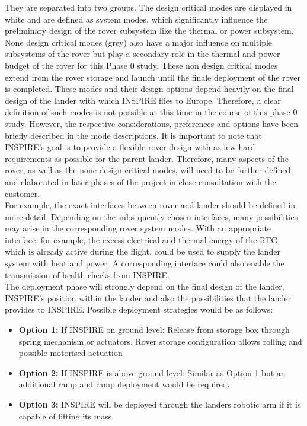 They are separated into two groups. The design critical modes are displayed in white and are defined as system modes, which significantly influence the preliminary design of the rover subsystem like the thermal or power subsystem. None design critical modes (grey) also have a major influence on multiple subsystems of the rover but play a secondary role in the thermal and power budget of the rover for this Phase 0 study. These non design critical modes extend from the rover storage and launch until the finale deployment of the rover is completed. These modes and their design options depend heavily on the final design of the lander with which INSPIRE flies to Europe. Therefore, a clear definition of such modes is not possible at this time in the course of this phase 0 study. However, the respective considerations, preferences and options have been briefly described in the mode descriptions. It is important to note that INSPIRE's goal is to provide a flexible rover design with as few hard requirements as possible for the parent lander. Therefore, many aspects of the rover, as well as the none design critical modes, will need to be further defined and elaborated in later phases of the project in close consultation with the customer. \\
For example, the exact interfaces between rover and lander should be defined in more detail. Depending on the subsequently chosen interfaces, many possibilities may arise in the corresponding rover system modes. With an appropriate interface, for example, the excess electrical and thermal energy of the RTG, which is already active during the flight, could be used to supply the lander system with heat and power. A corresponding interface could also enable the transmission of health checks from INSPIRE. \\
The deployment phase will strongly depend on the final design of the lander, INSPIRE's position within the lander and also the possibilities that the lander provides to INSPIRE.
Possible deployment strategies would be as follows:

\begin{itemize}
\itemsep0pt
\item	\textbf{Option 1:} If INSPIRE on ground level: Release from storage box through spring mechanism or actuators. Rover storage configuration allows rolling and possible motorised actuation
\item	\textbf{Option 2:} If INSPIRE is above ground level: Similar as Option 1 but an additional ramp and ramp deployment would be required.
\item	\textbf{Option 3:} INSPIRE will be deployed through the landers robotic arm if it is capable of lifting its mass.
\end{itemize}



